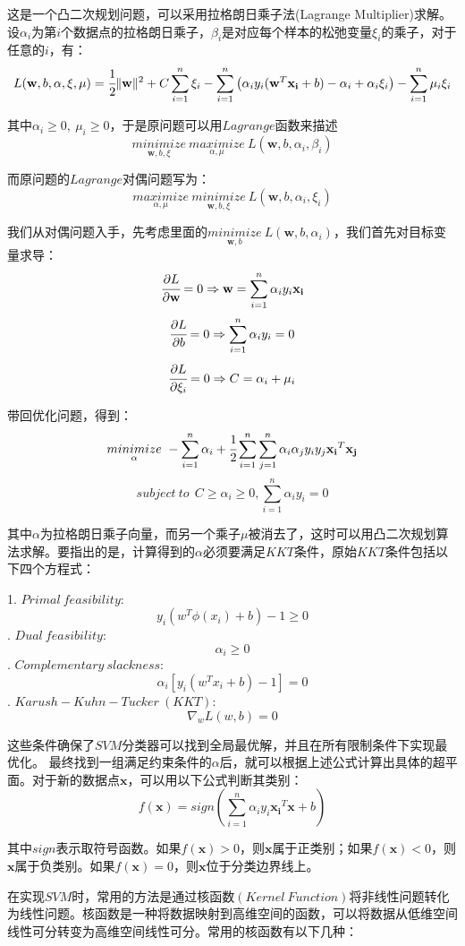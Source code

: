 \documentclass{article}
\begin{document}
这是一个凸二次规划问题，可以采用拉格朗日乘子法(Lagrange Multiplier)求解。设$\alpha_i$为第$i$个数据点的拉格朗日乘子，$\beta_i$是对应每个样本的松弛变量$\xi_i$的乘子，对于任意的$i$，有：
$$L(\mathbf{w},b,\alpha,\xi,\mu)=\cfrac{1}{2} \lVert \mathbf{w} \rVert^2+C\sum_{i=1}^{n}\xi_i-\sum_{i=1}^{n} \left( \alpha_iy_i(\mathbf{w}^T\mathbf{x_i}+b)-\alpha_i+\alpha_i\xi_i\right)-\sum_{i=1}^{n}\mu_i\xi_i$$

其中$\alpha_i\geq 0,\ \mu_i\geq 0$，于是原问题可以用$Lagrange$函数来描述
$$\underset{\mathbf{w},b,\xi}{minimize}\ \underset{\alpha,\mu}{maximize}\ L(\mathbf{w},b,\alpha_i,\beta_i)$$

而原问题的$Lagrange$对偶问题写为：
$$\underset{\alpha,\mu}{maximize}\ \underset{\mathbf{w},b,\xi}{minimize}\ L(\mathbf{w},b,\alpha_i,\xi_i)$$

我们从对偶问题入手，先考虑里面的$\underset{\mathbf{w},b}{minimize}\ L(\mathbf{w},b,\alpha_i)$，我们首先对目标变量求导：
$$\cfrac{\partial L}{\partial \mathbf{w}}=0 \Rightarrow \mathbf{w}=\sum_{i=1}^n \alpha_iy_i\mathbf{x_i}$$
$$\cfrac{\partial L}{\partial b}=0 \Rightarrow \sum_{i=1}^n \alpha_iy_i=0$$
$$\cfrac{\partial L}{\partial \xi_i}=0 \Rightarrow C=\alpha_i+\mu_i$$

带回优化问题，得到：
$$\underset{\alpha}{minimize}\ -\sum_{i=1}^n \alpha_i+\cfrac{1}{2}\sum_{i=1}^    n \sum_{j=1}^n\alpha_i\alpha_jy_iy_j\mathbf{x_i}^T\mathbf{x_j}$$
$$ subject\ to\ \  C\geq \alpha_i \geq 0, \sum_{i=1}^n \alpha_iy_i=0$$

其中$\alpha$为拉格朗日乘子向量，而另一个乘子$\mu$被消去了，这时可以用凸二次规划算法求解。要指出的是，计算得到的$\alpha$必须要满足$KKT$条件，原始$KKT$条件包括以下四个方程式：

1. $Primal\ feasibility$:
$$y_i(w^T\phi(x_i)+b)-1 \ge 0$$
. $Dual\ feasibility$:
$$\alpha_i \ge 0$$
. $Complementary\ slackness$:
$$\alpha_i[y_i(w^Tx_i+b)-1] = 0$$
. $Karush-Kuhn-Tucker\ (KKT)$:
$$\nabla_wL(w,b) = 0$$

这些条件确保了$SVM$分类器可以找到全局最优解，并且在所有限制条件下实现最优化。
最终找到一组满足约束条件的$\alpha$后，就可以根据上述公式计算出具体的超平面。对于新的数据点$\mathbf{x}$，可以用以下公式判断其类别：
$$f(\mathbf{x})=sign(\sum_{i=1}^n \alpha_i y_i \mathbf{x_i}^T \mathbf{x}+b)$$

其中$sign$表示取符号函数。如果$f(\mathbf{x})>0$，则$\mathbf{x}$属于正类别；如果$f(\mathbf{x})<0$，则$\mathbf{x}$属于负类别。如果$f(\mathbf{x})=0$，则$\mathbf{x}$位于分类边界线上。

在实现$SVM$时，常用的方法是通过核函数$(Kernel\ Function)$将非线性问题转化为线性问题。核函数是一种将数据映射到高维空间的函数，可以将数据从低维空间线性可分转变为高维空间线性可分。常用的核函数有以下几种：
\end{document}
